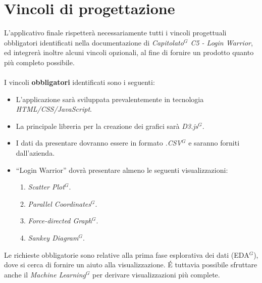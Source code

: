 \section{Vincoli di progettazione}

L'applicativo finale rispetterà necessariamente tutti i vincoli progettuali obbligatori identificati nella documentazione di \textit{Capitolato$^{G}$ C5 - Login Warrior}, ed integrerà inoltre alcuni vincoli opzionali, al fine di fornire un prodotto quanto più completo possibile. \\ \\
I vincoli \textbf{obbligatori} identificati sono i seguenti:
\begin{itemize}
	\item L’applicazione sarà sviluppata prevalentemente in tecnologia \textit{HTML/CSS/JavaScript}.
	\item La principale libreria per la creazione dei grafici sarà \textit{D3.js$^{G}$}.
	\item I dati da presentare dovranno essere in formato \textit{.CSV$^{G}$} e saranno forniti 
			dall'azienda.
	\item “Login Warrior” dovrà presentare almeno le seguenti visualizzazioni:
		 \begin{enumerate}
                    \item \textit{Scatter Plot$^{G}$}.
                    \item \textit{Parallel Coordinates$^{G}$}.
                    \item \textit{Force-directed Graph$^{G}$}.
                    \item \textit{Sankey Diagram$^{G}$}.
		\end{enumerate}
\end{itemize}

\noindent
Le richieste obbligatorie sono relative alla prima fase esplorativa dei dati (EDA$^{G}$), dove si cerca di fornire un aiuto alla visualizzazione. \' E tuttavia possibile sfruttare anche il \textit{Machine Learning$^{G}$} per derivare visualizzazioni più complete.

